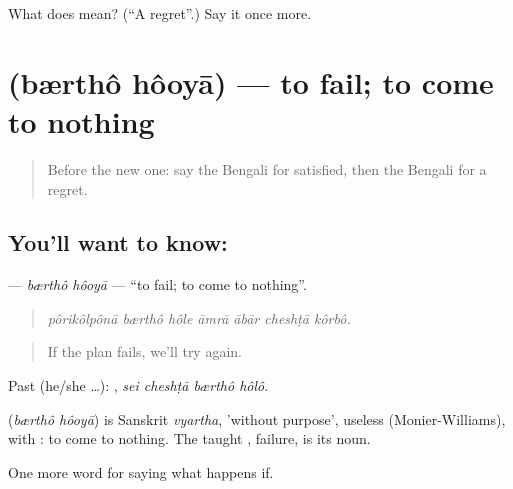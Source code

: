 \begin{tcolorbox}[breakable,colback=teal!4,colframe=teal!35!black,title={Before you move on}]
What does  mean? (\textquotedblleft{}A regret\textquotedblright{}.) Say it once more.
\end{tcolorbox}
\section[\texorpdfstring{\bn{ব্যর্থ} \bn{হওয়া} (bærthô hôoyā)}{ব্যর্থ হওয়া (bærthô hôoyā)}]{  (bærthô hôoyā) — to fail; to come to nothing}

\label{lesson:BN-C383-bertho-hooya}



\begin{quote}
Before the new one: say the Bengali for satisfied, then the Bengali for a regret.
\end{quote}

\subsection*{You'll want to know:  }
\textbf{ } — \emph{bærthô hôoyā} — \textquotedblleft{}to fail; to come to nothing\textquotedblright{}.

\begin{quote}
      
\end{quote}

\begin{quote}
\emph{pôrikôlpônā bærthô hôle āmrā ābār cheshṭā kôrbô.}
\end{quote}

\begin{quote}
If the plan fails, we'll try again.
\end{quote}

Past (he/she …):    , \emph{sei cheshṭā bærthô hôlô}.

\begin{cousinweb}
\textbf{ } (\emph{bærthô hôoyā}) is Sanskrit \emph{vyartha}, 'without purpose', useless (Monier-Williams), with : to come to nothing. The taught , failure, is its noun.
\end{cousinweb}

\begin{grammarlens}[title={What you've built}]
One more word for saying what happens if.
\end{grammarlens}

